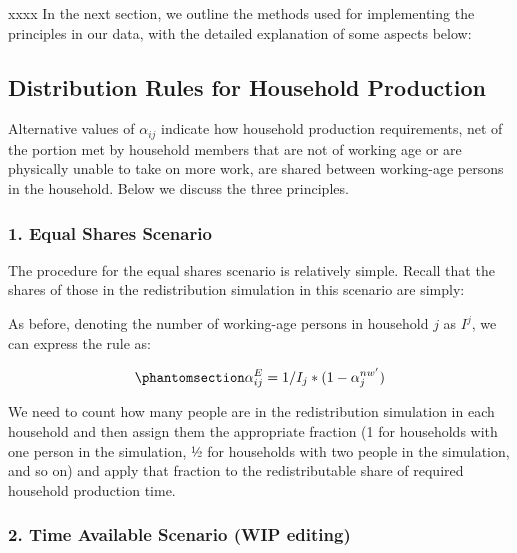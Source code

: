 \documentclass[
  11pt,
]{article}
\begin{document}
xxxx In the next section, we outline the methods used for implementing
the principles in our data, with the detailed explanation of some
aspects below:

\subsection{Distribution Rules for Household
Production}\label{distribution-rules-for-household-production}

Alternative values of \(\alpha_{ij}\) indicate how household production
requirements, net of the portion met by household members that are not
of working age or are physically unable to take on more work, are shared
between working-age persons in the household. Below we discuss the three
principles.

\subsubsection{1. Equal Shares Scenario}\label{equal-shares-scenario}

The procedure for the equal shares scenario is relatively simple. Recall
that the shares of those in the redistribution simulation in this
scenario are simply:

As before, denoting the number of working-age persons in household \(j\)
as \(I^j\), we can express the rule as:

\begin{equation}\phantomsection\label{eq-r1}{\alpha_{ij}^E= 1/I_j*(1-\alpha_{j}^{nw'})
}\end{equation}

We need to count how many people are in the redistribution simulation in
each household and then assign them the appropriate fraction (1 for
households with one person in the simulation, 1⁄2 for households with
two people in the simulation, and so on) and apply that fraction to the
redistributable share of required household production time.

\subsubsection{2. Time Available Scenario (WIP
editing)}\label{time-available-scenario-wip-editing}
\end{document}
